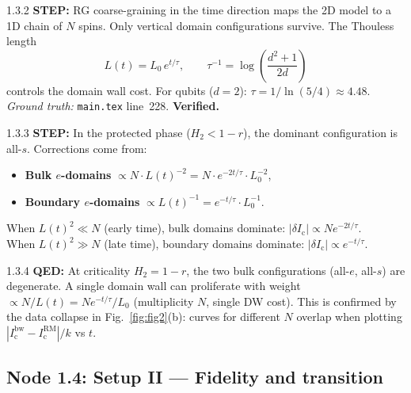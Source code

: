 \documentclass[11pt,a4paper]{article}
\newcommand{\Ic}{I_{\mathrm{c}}}
\begin{document}
\begin{proofnode}{1.3.2}
\textbf{STEP:} RG coarse-graining in the time direction maps the 2D model to a 1D chain of $N$ spins. Only vertical domain configurations survive. The Thouless length
\begin{equation}
    L(t) = L_0 \, e^{t/\tau}, \qquad \tau^{-1} = \log\!\left(\frac{d^2+1}{2d}\right)
    \label{eq:thouless}
\end{equation}
controls the domain wall cost. For qubits ($d=2$): $\tau = 1/\ln(5/4) \approx 4.48$.\\
\textit{Ground truth:} \texttt{main.tex} line~228. \textbf{Verified.}
\end{proofnode}

\begin{proofnode}{1.3.3}
\textbf{STEP:} In the protected phase ($H_2 < 1-r$), the dominant configuration is all-$s$. Corrections come from:
\begin{itemize}[nosep]
    \item[(i)] \textbf{Bulk $e$-domains} $\propto N \cdot L(t)^{-2} = N \cdot e^{-2t/\tau} \cdot L_0^{-2}$,
    \item[(ii)] \textbf{Boundary $e$-domains} $\propto L(t)^{-1} = e^{-t/\tau} \cdot L_0^{-1}$.
\end{itemize}
When $L(t)^2 \ll N$ (early time), bulk domains dominate: $|\delta \Ic| \propto N e^{-2t/\tau}$.\\
When $L(t)^2 \gg N$ (late time), boundary domains dominate: $|\delta \Ic| \propto e^{-t/\tau}$.
\end{proofnode}

\begin{proofnode}{1.3.4}
\textbf{QED:} At criticality $H_2 = 1-r$, the two bulk configurations (all-$e$, all-$s$) are degenerate. A single domain wall can proliferate with weight $\propto N/L(t) = N e^{-t/\tau}/L_0$ (multiplicity $N$, single DW cost). This is confirmed by the data collapse in Fig.~\ref{fig:fig2}(b): curves for different $N$ overlap when plotting $|\Ic^{\mathrm{bw}} - \Ic^{\mathrm{RM}}|/k$ vs $t$.
\end{proofnode}

\subsection{Node 1.4: Setup II --- Fidelity and transition}
\label{sec:node14}
\end{document}
